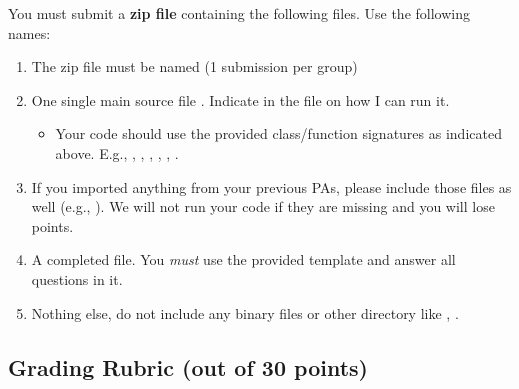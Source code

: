 You must submit a \textbf{zip file} containing the following files. Use the following names:

\begin{enumerate}
\item The zip file must be named  (1 submission per group)
\item One single main source file . Indicate in the  file on how I can run it.
    \begin{itemize}
    \item Your code should use the provided class/function signatures as indicated above. E.g., , , , , , .
    \end{itemize}
\item If you imported anything from your previous PAs, please include those files as well (e.g., ). We will not run your code if they are missing and you will lose points.
\item A completed  file. You \emph{must} use the provided template and answer all questions in it.
\item Nothing else, do not include any binary files or other directory like , .
\end{enumerate}


\subsection{Grading Rubric (out of 30 points)}


